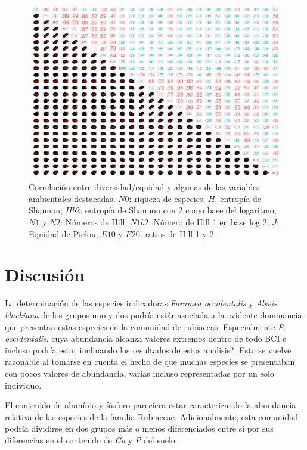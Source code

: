 \documentclass[11pt,]{article}
\begin{document}
\begin{figure}
\centering
\includegraphics[height=0.50000\textwidth]{panel_cor_indcs_diversidad1_columnas_quitadas.png}
\caption{Correlación entre diversidad/equidad y algunas de las variables
ambientales destacadas. \(N0\): riqueza de especies; \(H\): entropía de
Shannon; \(Hb2\): entropía de Shannon con 2 como base del logaritmo;
\(N1\) y \(N2\): Números de Hill; \(N1b2\): Número de Hill 1 en base log
2; \(J\): Equidad de Pielou; \(E10\) y \(E20\): ratios de Hill 1 y 2.
\label{fig:panel_cor_indics_diversidad1_columnnas_quitadas}}
\end{figure}

\section{Discusión}\label{discusiuxf3n}

La determinación de las especies indicadoras \emph{Faramea occidentalis}
y \emph{Alseis blackiana} de los grupos uno y dos podría estár asociada
a la evidente dominancia que presentan estas especies en la comunidad de
rubiaceas. Especialmente \emph{F. occidentalis}, cuya abundancia alcanza
valores extremos dentro de todo BCI e incluso podría estar inclinando
los resultados de estos analisis?. Esto se vuelve razonable al tomarse
en cuenta el hecho de que muchas especies se presentaban con pocos
valores de abundancia, varias incluso representadas por un solo
individuo.

El contenido de alumínio y fósforo pareciera estar caracterizando la
abundancia relativa de las especies de la familia Rubiaceae.
Adicionalmente, esta comunidad podría dividirse en dos grupos más o
menos diferenciados entre sí por sus diferencias en el contenido de
\emph{Cu} y \emph{P} del suelo.
\end{document}
